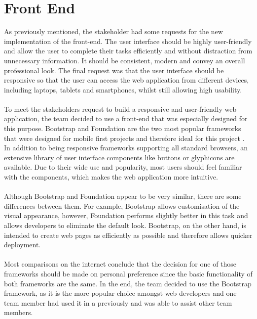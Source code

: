 \documentclass{l3proj}
\begin{document}
\section{Front End}
As previously mentioned, the stakeholder had some requests for the new implementation of the front-end. The user interface should be highly user-friendly and allow the user to complete their tasks efficiently and without distraction from unnecessary information. It should be consistent, modern and convey an overall professional look. The final request was that the user interface should be responsive so that the user can access the web application from different devices, including laptops, tablets and smartphones, whilst still allowing high usability.\\
\\To meet the stakeholders request to build a responsive and user-friendly web application, the team decided to use a front-end that was especially designed for this purpose. Bootstrap and Foundation are the two most popular frameworks that were designed for mobile first projects and therefore ideal for this project \cite{interaction}. In addition to being responsive frameworks supporting all standard browsers, an extensive library of user interface components like buttons or glyphicons are available. Due to their wide use and popularity, most users should feel familiar with the components, which makes the web application more intuitive.\\
\\Although Bootstrap and Foundation appear to be very similar, there are some differences between them. For example, Bootstrap allows customisation of the visual appearance, however, Foundation performs slightly better in this task and allows developers to eliminate the default look. Bootstrap, on the other hand, is intended to create web pages as efficiently as possible and therefore allows quicker deployment.\\
\\ Most comparisons on the internet conclude that the decision for one of those frameworks should be made on personal preference since the basic functionality of both frameworks are the same. In the end, the team decided to use the Bootstrap framework, as it is the more popular choice amongst web developers and one team member had used it in a previously and was able to assist other team members.
\end{document}
